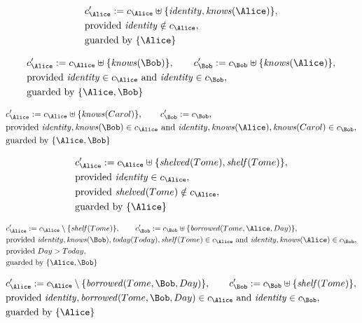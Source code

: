 \begin{align*}
&
c'_
{
\Alice
}
 := 
c_
{
\Alice
}
 \uplus 
\{
\mathit{
identity
}
,
\mathit{
knows
}
(
\Alice
)
\}
,\\
&
\text{provided } 
\mathit{
identity
}
 \notin c_
{
\Alice
}
,\\
&
\text{guarded by } \{
\Alice
\}
\end{align*}

\begin{align*}
&
c'_
{
\Alice
}
 := 
c_
{
\Alice
}
 \uplus 
\{
\mathit{
knows
}
(
\Bob
)
\}
, \qquad 
c'_
{
\Bob
}
 := 
c_
{
\Bob
}
 \uplus 
\{
\mathit{
knows
}
(
\Alice
)
\}
,\\
&
\text{provided } 
\mathit{
identity
}
 \in c_
{
\Alice
}
 \text{ and } 
\mathit{
identity
}
 \in c_
{
\Bob
}
,\\
&
\text{guarded by } \{
\Alice
,
\Bob
\}
\end{align*}

\begin{align*}
&
c'_
{
\Alice
}
 := 
c_
{
\Alice
}
 \uplus 
\{
\mathit{
knows
}
(
Carol
)
\}
, \qquad 
c'_
{
\Bob
}
 := 
c_
{
\Bob
}
,\\
&
\text{provided } 
\mathit{
identity
}
,
\mathit{
knows
}
(
\Bob
)
 \in c_
{
\Alice
}
 \text{ and } 
\mathit{
identity
}
,
\mathit{
knows
}
(
\Alice
)
,
\mathit{
knows
}
(
Carol
)
 \in c_
{
\Bob
}
,\\
&
\text{guarded by } \{
\Alice
,
\Bob
\}
\end{align*}

\begin{align*}
&
c'_
{
\Alice
}
 := 
c_
{
\Alice
}
 \uplus 
\{
\mathit{
shelved
}
(
Tome
)
,
\mathit{
shelf
}
(
Tome
)
\}
,\\
&
\text{provided } 
\mathit{
identity
}
 \in c_
{
\Alice
}
,\\
&
\text{provided } 
\mathit{
shelved
}
(
Tome
)
 \notin c_
{
\Alice
}
,\\
&
\text{guarded by } \{
\Alice
\}
\end{align*}

\begin{align*}
&
c'_
{
\Alice
}
 := 
c_
{
\Alice
}
 \setminus 
\{
\mathit{
shelf
}
(
Tome
)
\}
, \qquad 
c'_
{
\Bob
}
 := 
c_
{
\Bob
}
 \uplus 
\{
\mathit{
borrowed
}
(
Tome
,
\Alice
,
Day
)
\}
,\\
&
\text{provided } 
\mathit{
identity
}
,
\mathit{
knows
}
(
\Bob
)
,
\mathit{
today
}
(
Today
)
,
\mathit{
shelf
}
(
Tome
)
 \in c_
{
\Alice
}
 \text{ and } 
\mathit{
identity
}
,
\mathit{
knows
}
(
\Alice
)
 \in c_
{
\Bob
}
,\\
&
\text{provided } 
Day
>
Today
,\\
&
\text{guarded by } \{
\Alice
,
\Bob
\}
\end{align*}

\begin{align*}
&
c'_
{
\Alice
}
 := 
c_
{
\Alice
}
 \setminus 
\{
\mathit{
borrowed
}
(
Tome
,
\Bob
,
Day
)
\}
, \qquad 
c'_
{
\Bob
}
 := 
c_
{
\Bob
}
 \uplus 
\{
\mathit{
shelf
}
(
Tome
)
\}
,\\
&
\text{provided } 
\mathit{
identity
}
,
\mathit{
borrowed
}
(
Tome
,
\Bob
,
Day
)
 \in c_
{
\Alice
}
 \text{ and } 
\mathit{
identity
}
 \in c_
{
\Bob
}
,\\
&
\text{guarded by } \{
\Alice
\}
\end{align*}
